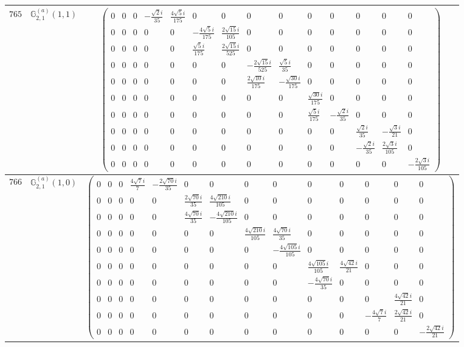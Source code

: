 \documentclass[fleqn,8pt,landscape]{jsarticle}
\begin{document}
\begin{center}
\begin{longtable}{ccc}
$ 765 $ & $ \mathbb{G}_{2,1}^{(a)}(1,1) $ & $ \begin{pmatrix} 0 & 0 & 0 & - \frac{\sqrt{2} i}{35} & \frac{4 \sqrt{5} i}{175} & 0 & 0 & 0 & 0 & 0 & 0 & 0 & 0 & 0 \\ 0 & 0 & 0 & 0 & 0 & - \frac{4 \sqrt{5} i}{175} & \frac{2 \sqrt{15} i}{105} & 0 & 0 & 0 & 0 & 0 & 0 & 0 \\ 0 & 0 & 0 & 0 & 0 & \frac{\sqrt{5} i}{175} & \frac{2 \sqrt{15} i}{525} & 0 & 0 & 0 & 0 & 0 & 0 & 0 \\ 0 & 0 & 0 & 0 & 0 & 0 & 0 & - \frac{2 \sqrt{15} i}{525} & \frac{\sqrt{5} i}{35} & 0 & 0 & 0 & 0 & 0 \\ 0 & 0 & 0 & 0 & 0 & 0 & 0 & \frac{2 \sqrt{10} i}{175} & - \frac{\sqrt{30} i}{175} & 0 & 0 & 0 & 0 & 0 \\ 0 & 0 & 0 & 0 & 0 & 0 & 0 & 0 & 0 & \frac{\sqrt{30} i}{175} & 0 & 0 & 0 & 0 \\ 0 & 0 & 0 & 0 & 0 & 0 & 0 & 0 & 0 & \frac{\sqrt{5} i}{175} & - \frac{\sqrt{2} i}{35} & 0 & 0 & 0 \\ 0 & 0 & 0 & 0 & 0 & 0 & 0 & 0 & 0 & 0 & 0 & \frac{\sqrt{2} i}{35} & - \frac{\sqrt{3} i}{21} & 0 \\ 0 & 0 & 0 & 0 & 0 & 0 & 0 & 0 & 0 & 0 & 0 & - \frac{\sqrt{2} i}{35} & \frac{2 \sqrt{3} i}{105} & 0 \\ 0 & 0 & 0 & 0 & 0 & 0 & 0 & 0 & 0 & 0 & 0 & 0 & 0 & - \frac{2 \sqrt{3} i}{105} \end{pmatrix} $ \\ \hline
$ 766 $ & $ \mathbb{G}_{2,1}^{(a)}(1,0) $ & $ \begin{pmatrix} 0 & 0 & 0 & \frac{4 \sqrt{7} i}{7} & - \frac{2 \sqrt{70} i}{35} & 0 & 0 & 0 & 0 & 0 & 0 & 0 & 0 & 0 \\ 0 & 0 & 0 & 0 & 0 & \frac{2 \sqrt{70} i}{35} & \frac{4 \sqrt{210} i}{105} & 0 & 0 & 0 & 0 & 0 & 0 & 0 \\ 0 & 0 & 0 & 0 & 0 & \frac{4 \sqrt{70} i}{35} & - \frac{4 \sqrt{210} i}{105} & 0 & 0 & 0 & 0 & 0 & 0 & 0 \\ 0 & 0 & 0 & 0 & 0 & 0 & 0 & \frac{4 \sqrt{210} i}{105} & \frac{4 \sqrt{70} i}{35} & 0 & 0 & 0 & 0 & 0 \\ 0 & 0 & 0 & 0 & 0 & 0 & 0 & 0 & - \frac{4 \sqrt{105} i}{105} & 0 & 0 & 0 & 0 & 0 \\ 0 & 0 & 0 & 0 & 0 & 0 & 0 & 0 & 0 & \frac{4 \sqrt{105} i}{105} & \frac{4 \sqrt{42} i}{21} & 0 & 0 & 0 \\ 0 & 0 & 0 & 0 & 0 & 0 & 0 & 0 & 0 & - \frac{4 \sqrt{70} i}{35} & 0 & 0 & 0 & 0 \\ 0 & 0 & 0 & 0 & 0 & 0 & 0 & 0 & 0 & 0 & 0 & 0 & \frac{4 \sqrt{42} i}{21} & 0 \\ 0 & 0 & 0 & 0 & 0 & 0 & 0 & 0 & 0 & 0 & 0 & - \frac{4 \sqrt{7} i}{7} & \frac{2 \sqrt{42} i}{21} & 0 \\ 0 & 0 & 0 & 0 & 0 & 0 & 0 & 0 & 0 & 0 & 0 & 0 & 0 & - \frac{2 \sqrt{42} i}{21} \end{pmatrix} $ \\ \hline

\end{longtable}
\end{center}
\end{document}
